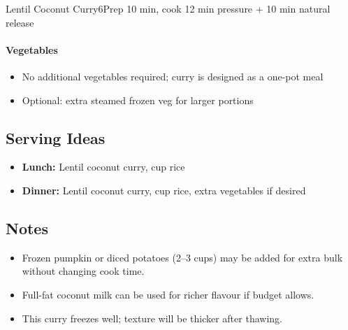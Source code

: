 \begin{recipebox}{Lentil Coconut Curry}{6}{Prep 10 min, cook 12 min pressure + 10 min natural release}
\paragraph{Vegetables}
\begin{itemize}
    \item No additional vegetables required; curry is designed as a one-pot meal
    \item Optional: extra steamed frozen veg for larger portions
\end{itemize}

\subsection*{Serving Ideas}
\begin{itemize}
    \item \textbf{Lunch:} Lentil coconut curry,  cup rice
    \item \textbf{Dinner:} Lentil coconut curry,  cup rice, extra vegetables if desired
\end{itemize}

\subsection*{Notes}
\begin{itemize}
    \item Frozen pumpkin or diced potatoes (2--3 cups) may be added for extra bulk without changing cook time.
    \item Full-fat coconut milk can be used for richer flavour if budget allows.
    \item This curry freezes well; texture will be thicker after thawing.
\end{itemize}
\end{recipebox}

